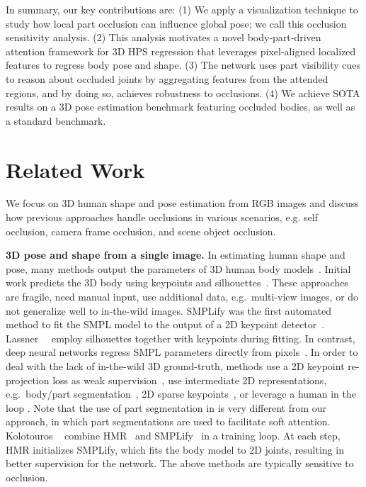 \documentclass[10pt,twocolumn,letterpaper,usenames,dvipsnames]{article}
\renewcommand{\eg}{e.g.\xspace}
\begin{document}
In  summary,  our  key  contributions   are:
(1) We apply a visualization technique \cite{zeiler2014visualizing} to study how local part occlusion can influence global pose; we call this occlusion sensitivity analysis.
(2) This analysis motivates a novel body-part-driven attention framework for 3D HPS regression that leverages pixel-aligned localized features to regress body pose and shape. 
(3) The network uses part visibility cues to reason about occluded joints by aggregating features from the attended regions, and by doing so, achieves robustness to occlusions. 
(4) We achieve SOTA results on a 3D pose estimation benchmark featuring occluded bodies, as well as a standard benchmark. 	\section{Related Work}
\label{related_work}
We focus on 3D human shape and pose estimation from RGB images and discuss how previous approaches handle occlusions in various scenarios, \eg self occlusion, camera frame occlusion, and scene object occlusion.

{\bf 3D pose and shape from a single image.} 
In estimating human shape and pose, many methods output the parameters of 3D human body models~\cite{scape,looper_smpl,SMPL-X:2019}.
Initial work predicts the 3D body using keypoints and silhouettes~\cite{agarwal2006recovering,balan2008,Balan:CVPR:2007,grauman2003inferring,sigal2008combined}.
These approaches are fragile, need manual input, use additional data, \eg~multi-view images, or do not generalize well to in-the-wild images.
SMPLify \cite{bogo_smplify} was the first automated method to fit the SMPL model to the output of a 2D keypoint detector~\cite{Leonid2016DeepCut}. Lassner~\etal~\cite{lassner_up3d} employ silhouettes together with keypoints during fitting. 
In contrast, deep neural networks regress SMPL parameters directly from pixels~\cite{guler_2019_CVPR,kanazawa_hmr,omran2018nbf,pavlakos2018humanshape,Tan,tung2017self}. 
In order to deal with the lack of in-the-wild 3D ground-truth, methods use a 2D keypoint re-projection loss as weak supervision~\cite{kanazawa_hmr,Tan,tung2017self}, use intermediate 2D representations, \eg~body/part segmentation~\cite{omran2018nbf,pavlakos2018humanshape,zanfir2020weakly}, 2D sparse keypoints~\cite{sengupta2020synthetic,zanfir2020weakly}, or leverage a human in the loop \cite{lassner_up3d}.
Note that the use of part segmentation in \cite{lassner_up3d,omran2018nbf,zanfir2020weakly} is very different from our approach, in which part segmentations are used to facilitate soft attention.
Kolotouros \etal~\cite{SPIN:ICCV:2019} combine HMR~\cite{kanazawa_hmr} and SMPLify~\cite{bogo_smplify} in a training loop. At each step, HMR initializes SMPLify, which fits the body model to 2D joints, resulting in better supervision for the network. 
The above methods are typically sensitive to occlusion.
\end{document}
